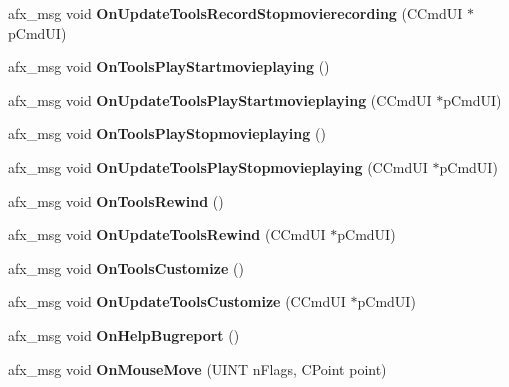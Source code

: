 \begin{DoxyCompactItemize}
afx\+\_\+msg void {\bfseries On\+Update\+Tools\+Record\+Stopmovierecording} (C\+Cmd\+UI $\ast$p\+Cmd\+UI)
\item 
\mbox{\label{class_main_wnd_a96ea89975374d5b7a434070d58e9c260}} 
afx\+\_\+msg void {\bfseries On\+Tools\+Play\+Startmovieplaying} ()
\item 
\mbox{\label{class_main_wnd_aca67af593b1041fbdab04ddfd2bf5910}} 
afx\+\_\+msg void {\bfseries On\+Update\+Tools\+Play\+Startmovieplaying} (C\+Cmd\+UI $\ast$p\+Cmd\+UI)
\item 
\mbox{\label{class_main_wnd_a82b88a60ca164731e9ccec3055e763c9}} 
afx\+\_\+msg void {\bfseries On\+Tools\+Play\+Stopmovieplaying} ()
\item 
\mbox{\label{class_main_wnd_ab8effcda4b05e28ae51729df11115cae}} 
afx\+\_\+msg void {\bfseries On\+Update\+Tools\+Play\+Stopmovieplaying} (C\+Cmd\+UI $\ast$p\+Cmd\+UI)
\item 
\mbox{\label{class_main_wnd_a70093f3937e2d2c45832749226e6eab5}} 
afx\+\_\+msg void {\bfseries On\+Tools\+Rewind} ()
\item 
\mbox{\label{class_main_wnd_a540e2396272cb013f8490fe1a6c6e27c}} 
afx\+\_\+msg void {\bfseries On\+Update\+Tools\+Rewind} (C\+Cmd\+UI $\ast$p\+Cmd\+UI)
\item 
\mbox{\label{class_main_wnd_a37f9cc51f47fe32648f937b8ff64e955}} 
afx\+\_\+msg void {\bfseries On\+Tools\+Customize} ()
\item 
\mbox{\label{class_main_wnd_a628bccba9f50a91d0c37e23c7cecaf8a}} 
afx\+\_\+msg void {\bfseries On\+Update\+Tools\+Customize} (C\+Cmd\+UI $\ast$p\+Cmd\+UI)
\item 
\mbox{\label{class_main_wnd_aa2ca8cf6faaa7a20d52785029767c50f}} 
afx\+\_\+msg void {\bfseries On\+Help\+Bugreport} ()
\item 
\mbox{\label{class_main_wnd_a487d640fdc35218fbe8fd5d917cb104f}} 
afx\+\_\+msg void {\bfseries On\+Mouse\+Move} (U\+I\+NT n\+Flags, C\+Point point)

\end{DoxyCompactItemize}
